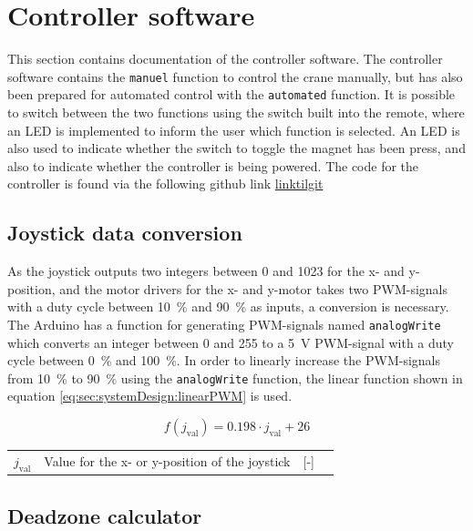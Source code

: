 \section{Controller software}\label{sec:controllerSoftware}

This section contains documentation of the controller software. The controller software contains the \texttt{manuel} function to control the crane manually, but has also been prepared for automated control with the \texttt{automated} function. It is possible to switch between the two functions using the switch built into the remote, where an LED is implemented to inform the user which function is selected. An LED is also used to indicate whether the switch to toggle the magnet has been press, and also to indicate whether the controller is being powered. The code for the controller is found via the following github link \url{linktilgit}

\subsection{Joystick data conversion}

As the joystick outputs two integers between 0 and 1023 for the x- and y-position, and the motor drivers for the x- and y-motor takes two PWM-signals with a duty cycle between \SI{10}{\%} and \SI{90}{\%} as inputs, a conversion is necessary. The Arduino has a function for generating PWM-signals named \texttt{analogWrite} which converts an integer between 0 and 255 to a \SI{5}{V} PWM-signal with a duty cycle between \SI{0}{\%} and \SI{100}{\%}. In order to linearly increase the PWM-signals from \SI{10}{\%} to \SI{90}{\%} using the \texttt{analogWrite} function, the linear function shown in equation \ref{eq:sec:systemDesign:linearPWM} is used.

\begin{equation}
    f(j_\text{val}) = 0.198 \cdot j_\text{val} + 26
    \label{eq:sec:systemDesign:linearPWM}
\end{equation}

\begin{table}[H]
    \begin{tabular}{l|l l l}
        $j_\text{val}$ & Value for the x- or y-position of the joystick & [-] \\
        \end{tabular}
\end{table}

\subsection{Deadzone calculator}

